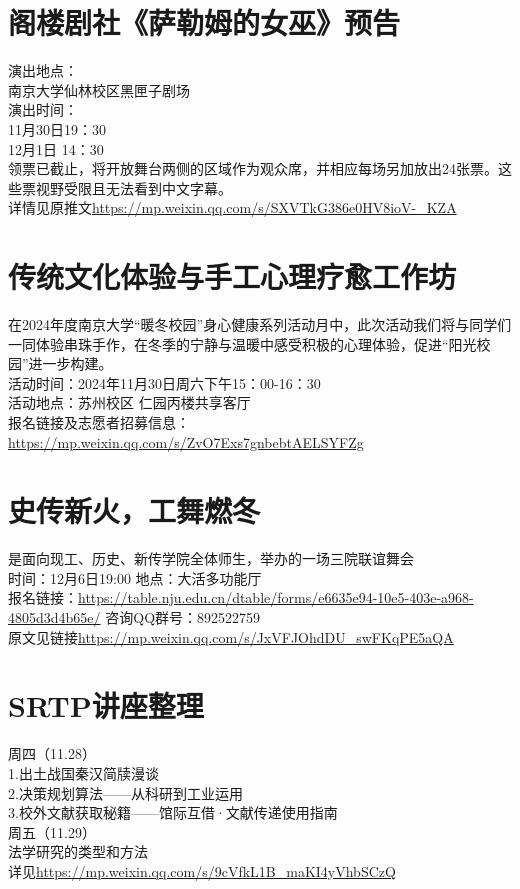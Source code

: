 \documentclass[letterpaper, 12pt]{article}
\begin{document}
\begin{multicols}{2}
\section{阁楼剧社《萨勒姆的女巫》预告}
演出地点：\\
南京大学仙林校区黑匣子剧场\\
演出时间：\\
11月30日19：30\\
12月1日 14：30\\
领票已截止，将开放舞台两侧的区域作为观众席，并相应每场另加放出24张票。这些票视野受限且无法看到中文字幕。\\
详情见原推文\url{https://mp.weixin.qq.com/s/SXVTkG386e0HV8ioV-_KZA}
\section{传统文化体验与手工心理疗愈工作坊}
在2024年度南京大学“暖冬校园”身心健康系列活动月中，此次活动我们将与同学们一同体验串珠手作，在冬季的宁静与温暖中感受积极的心理体验，促进“阳光校园”进一步构建。\\
活动时间：2024年11月30日周六下午15：00-16：30\\
活动地点：苏州校区 仁园丙楼共享客厅\\
报名链接及志愿者招募信息：\url{https://mp.weixin.qq.com/s/ZvO7Exs7gnbebtAELSYFZg}\\
\section{史传新火，工舞燃冬}
是面向现工、历史、新传学院全体师生，举办的一场三院联谊舞会\\
时间：12月6日19:00   地点：大活多功能厅\\
报名链接：\url{https://table.nju.edu.cn/dtable/forms/e6635e94-10e5-403e-a968-4805d3d4b65e/}
咨询QQ群号：892522759\\
原文见链接\url{https://mp.weixin.qq.com/s/JxVFJOhdDU_swFKqPE5aQA}\\
\section{SRTP讲座整理}
周四（11.28）\\
1.出土战国秦汉简牍漫谈\\
2.决策规划算法——从科研到工业运用\\
3.校外文献获取秘籍——馆际互借·文献传递使用指南\\
周五（11.29）\\
法学研究的类型和方法\\
详见\url{https://mp.weixin.qq.com/s/9cVfkL1B_maKI4yVhbSCzQ}

\end{multicols}
\end{document}
